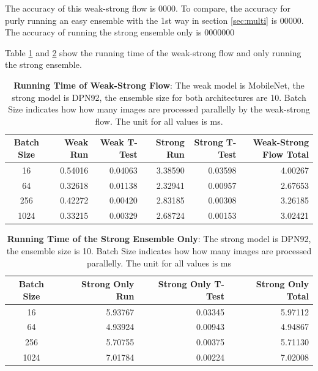 \documentclass{article}
\begin{document}
The accuracy of this weak-strong flow is 0000. To compare, the accuracy for purly running an easy ensemble with the 1st way in section \ref{sec:multi} is 00000. The accuracy of running the strong ensemble only is 0000000

Table \ref{WSFlow} and \ref{strong_only} show the running time of the weak-strong flow and only running the strong ensemble.


\begin{table}
    \caption{\textbf{Running Time of Weak-Strong Flow}: The weak model is MobileNet, the strong model is DPN92, the ensemble size for both architectures are 10. Batch Size indicates how how many images are processed parallelly by the weak-strong flow. The unit for all values is ms.}
    \centering
    \begin{tabular}{crrrrr}
        \toprule
        {} Batch Size &  Weak Run &  Weak T-Test &  Strong Run &  Strong T-Test &  Weak-Strong Flow Total \\
        \midrule
        16         &   0.54016 &      0.04063 &     3.38590 &        0.03598 &                 4.00267 \\
        64         &   0.32618 &      0.01138 &     2.32941 &        0.00957 &                 2.67653 \\
        256        &   0.42272 &      0.00420 &     2.83185 &        0.00308 &                 3.26185 \\
        1024       &   0.33215 &      0.00329 &     2.68724 &        0.00153 &                 3.02421 \\
        \bottomrule
    \end{tabular}
\label{WSFlow}
\end{table}

\begin{table}
    \caption{\textbf{Running Time of the Strong Ensemble Only}: The strong model is DPN92, the ensemble size is 10. Batch Size indicates how how many images are processed parallelly. The unit for all values is ms}
    \centering
    \begin{tabular}{crrr}
        \toprule
        {} Batch Size &  Strong Only Run &  Strong Only T-Test &  Strong Only Total \\
        \midrule
        16         &          5.93767 &             0.03345 &            5.97112 \\
        64         &          4.93924 &             0.00943 &            4.94867 \\
        256        &          5.70755 &             0.00375 &            5.71130 \\
        1024       &          7.01784 &             0.00224 &            7.02008 \\
        \bottomrule
        \end{tabular}
\label{strong_only}
\end{table}
\end{document}
